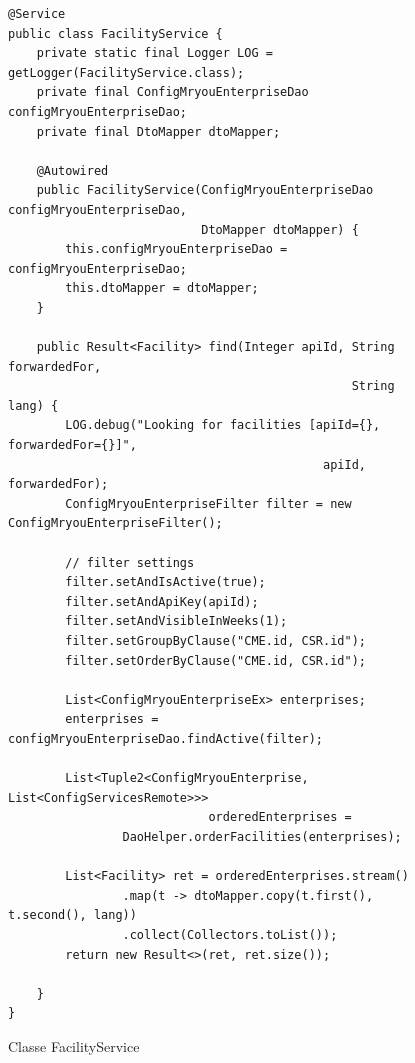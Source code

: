 \begin{figure}
\begin{verbatim}
@Service
public class FacilityService {
    private static final Logger LOG = getLogger(FacilityService.class);
    private final ConfigMryouEnterpriseDao configMryouEnterpriseDao;
    private final DtoMapper dtoMapper;

    @Autowired
    public FacilityService(ConfigMryouEnterpriseDao configMryouEnterpriseDao,
                           DtoMapper dtoMapper) {
        this.configMryouEnterpriseDao = configMryouEnterpriseDao;
        this.dtoMapper = dtoMapper;
    }

    public Result<Facility> find(Integer apiId, String forwardedFor, 
                                                String lang) {
        LOG.debug("Looking for facilities [apiId={}, forwardedFor={}]", 
                                            apiId, forwardedFor);
        ConfigMryouEnterpriseFilter filter = new ConfigMryouEnterpriseFilter();

        // filter settings
        filter.setAndIsActive(true);
        filter.setAndApiKey(apiId);
        filter.setAndVisibleInWeeks(1);
        filter.setGroupByClause("CME.id, CSR.id");
        filter.setOrderByClause("CME.id, CSR.id");

        List<ConfigMryouEnterpriseEx> enterprises;
        enterprises = configMryouEnterpriseDao.findActive(filter);

        List<Tuple2<ConfigMryouEnterprise, List<ConfigServicesRemote>>> 
                            orderedEnterprises =
                DaoHelper.orderFacilities(enterprises);

        List<Facility> ret = orderedEnterprises.stream()
                .map(t -> dtoMapper.copy(t.first(), t.second(), lang))
                .collect(Collectors.toList());
        return new Result<>(ret, ret.size());

    }
}
\end{verbatim}
\caption{Classe FacilityService}
\label{fig:facilityservice}
\end{figure}

